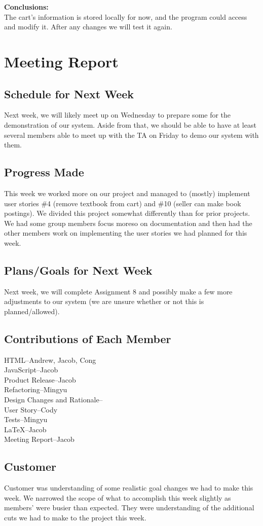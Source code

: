\documentclass[12pt]{article}
\begin{document}
	\textbf{Conclusions:} \\
	The cart’s information is stored locally for now, and the program could access and modify it. After any changes we will test it again.



	\section{Meeting Report}

		\subsection{Schedule for Next Week}
		Next week, we will likely meet up on Wednesday to prepare some for the demonstration
		of our system. Aside from that, we should be able to have at least several members
		able to meet up with the TA on Friday to demo our system with them.
		

		\subsection{Progress Made}
		This week we worked more on our project and managed to (mostly) implement user
		stories \#4 (remove textbook from cart) and \#10 (seller can make book postings).
		We divided this project somewhat differently than for prior projects. We had some
		group members focus moreso on documentation and then had the other members work on
		implementing the user stories we had planned for this week.

		\subsection{Plans/Goals for Next Week}
		Next week, we will complete Assignment 8 and possibly make a few more adjustments to our system (we are unsure whether or not this is planned/allowed).

		\subsection{Contributions of Each Member}
			HTML--Andrew, Jacob, Cong \\
			JavaScript--Jacob \\
			Product Release--Jacob \\
			Refactoring--Mingyu           \\
			Design Changes and Rationale-- \\
			User Story--Cody\\
			Tests--Mingyu \\
			LaTeX--Jacob \\
			Meeting Report--Jacob \\


		\subsection{Customer}
		Customer was understanding of some realistic goal changes we had to make this week. We narrowed the scope of what to accomplish this week slightly as members’ were busier than expected. They were understanding of the additional cuts we had to make
		to the project this week.

	
\end{document}

